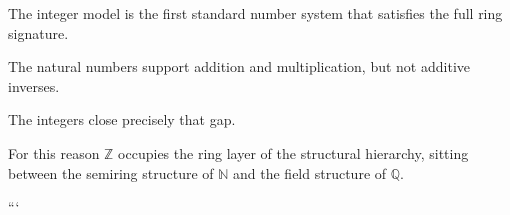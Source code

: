 
\begin{remark*}

The integer model is the first standard number system that satisfies the full
ring signature.

The natural numbers support addition and multiplication, but not additive
inverses.

The integers close precisely that gap.

For this reason $\mathbb Z$ occupies the ring layer of the structural hierarchy,
sitting between the semiring structure of $\mathbb N$ and the field structure of
$\mathbb Q$.

\end{remark*}
```
